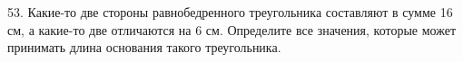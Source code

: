 53. Какие-то две стороны равнобедренного треугольника составляют в сумме 16 см, а какие-то две отличаются на 6 см. Определите все значения, которые может принимать длина основания такого треугольника.\\
